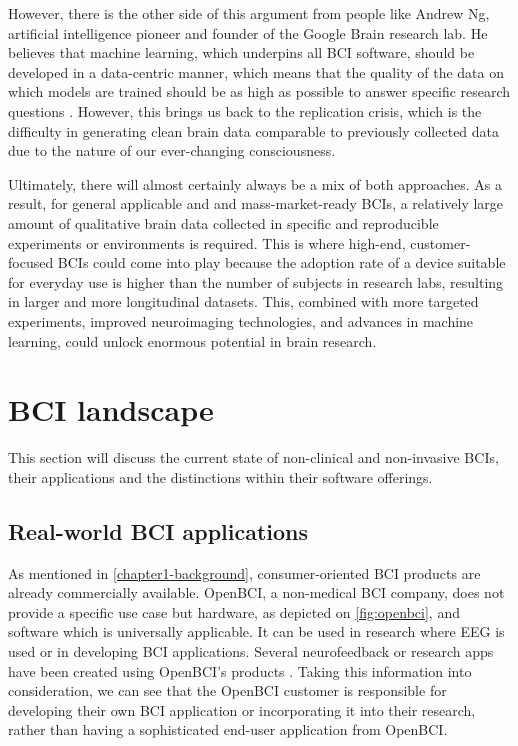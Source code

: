 However, there is the other side of this argument from people like Andrew Ng, artificial intelligence pioneer and founder of the Google Brain research lab. He believes that machine learning, which underpins all BCI software, should be developed in a data-centric manner, which means that the quality of the data on which models are trained should be as high as possible to answer specific research questions \citep{brown_why_2022}. However, this brings us back to the replication crisis, which is the difficulty in generating clean brain data comparable to previously collected data due to the nature of our ever-changing consciousness.

Ultimately, there will almost certainly always be a mix of both approaches. As a result, for general applicable and and mass-market-ready BCIs, a relatively large amount of qualitative brain data collected in specific and reproducible experiments or environments is required. This is where high-end, customer-focused BCIs could come into play because the adoption rate of a device suitable for everyday use is higher than the number of subjects in research labs, resulting in larger and more longitudinal datasets. This, combined with more targeted experiments, improved neuroimaging technologies, and advances in machine learning, could unlock enormous potential in brain research.

\section{BCI landscape}
\label{chapter2-research-landscape}

This section will discuss the current state of non-clinical and non-invasive BCIs, their applications and the distinctions within their software offerings.

\subsection{Real-world BCI applications}
\label{chapter2-real-world-bci-applications}

As mentioned in \autoref{chapter1-background}, consumer-oriented BCI products are already commercially available. OpenBCI, a non-medical BCI company, does not provide a specific use case but hardware, as depicted on \autoref{fig:openbci}, and software which is universally applicable. It can be used in research where EEG is used or in developing BCI applications. Several neurofeedback or research apps have been created using OpenBCI's products \citep{openbci_openbci_nodate}. Taking this information into consideration, we can see that the OpenBCI customer is responsible for developing their own BCI application or incorporating it into their research, rather than having a sophisticated end-user application from OpenBCI.


